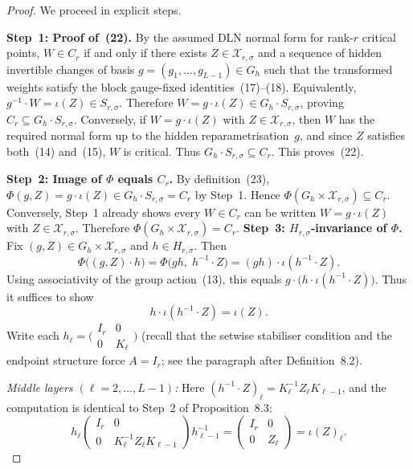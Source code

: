 \documentclass{article}
\theoremstyle{definition}
\begin{document}
\begin{proof}
We proceed in explicit steps.

\medskip
\textbf{Step~1: Proof of~(22).}
By the assumed DLN normal form for rank-$r$ critical points, $W \in C_r$ if and only if there exists $Z \in \mathcal X_{r,\sigma}$ and a sequence of hidden invertible changes of basis $g = (g_1, \dots, g_{L-1}) \in G_h$ such that the transformed weights satisfy the block gauge-fixed identities~(17)--(18).  Equivalently, $g^{-1} \cdot W = \iota(Z) \in S_{r,\sigma}$.  Therefore $W = g \cdot \iota(Z) \in G_h \cdot S_{r,\sigma}$, proving $C_r \subseteq G_h \cdot S_{r,\sigma}$.  Conversely, if $W = g \cdot \iota(Z)$ with $Z \in \mathcal X_{r,\sigma}$, then $W$ has the required normal form up to the hidden reparametrisation~$g$, and since $Z$ satisfies both~(14) and~(15), $W$ is critical.  Thus $G_h \cdot S_{r,\sigma} \subseteq C_r$.  This proves~(22).

\medskip
\textbf{Step~2: Image of $\Phi$ equals $C_r$.}
By definition~(23), $\Phi(g, Z) = g \cdot \iota(Z) \in G_h \cdot S_{r,\sigma} = C_r$ by Step~1.  Hence $\Phi(G_h \times \mathcal X_{r,\sigma}) \subseteq C_r$.  Conversely, Step~1 already shows every $W \in C_r$ can be written $W = g \cdot \iota(Z)$ with $Z \in \mathcal X_{r,\sigma}$.  Therefore $\Phi(G_h \times \mathcal X_{r,\sigma}) = C_r$.
\medskip
\textbf{Step~3: $H_{r,\sigma}$-invariance of $\Phi$.}
Fix $(g, Z) \in G_h \times \mathcal X_{r,\sigma}$ and $h \in H_{r,\sigma}$.  Then
\[
\Phi\bigl((g, Z) \cdot h\bigr) = \Phi\bigl(gh,\; h^{-1} \cdot Z\bigr)
= (gh) \cdot \iota(h^{-1} \cdot Z).
\]
Using associativity of the group action~(13), this equals $g \cdot \bigl(h \cdot \iota(h^{-1} \cdot Z)\bigr)$.  Thus it suffices to show
\begin{equation}\tag{$\star$}
h \cdot \iota(h^{-1} \cdot Z) = \iota(Z).
\end{equation}
Write each $h_\ell = \bigl(\begin{smallmatrix} I_r & 0 \\ 0 & K_\ell \end{smallmatrix}\bigr)$ (recall that the setwise stabiliser condition and the endpoint structure force $A = I_r$; see the paragraph after Definition~8.2).

\emph{Middle layers $(\ell = 2, \dots, L{-}1)$:}  Here $(h^{-1} \cdot Z)_\ell = K_\ell^{-1} Z_\ell K_{\ell-1}$, and the computation is identical to Step~2 of Proposition~8.3:
\[
h_\ell \begin{pmatrix} I_r & 0 \\ 0 & K_\ell^{-1} Z_\ell K_{\ell-1} \end{pmatrix} h_{\ell-1}^{-1}
= \begin{pmatrix} I_r & 0 \\ 0 & Z_\ell \end{pmatrix} = \iota(Z)_\ell.
\]


\end{proof}
\end{document}

